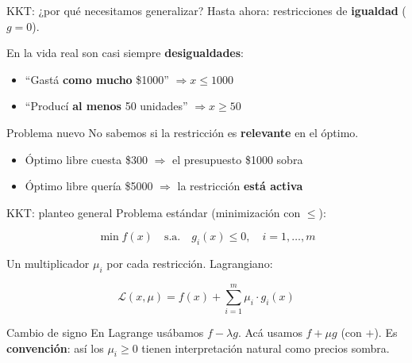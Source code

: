 \documentclass{beamer}
\begin{document}
\begin{frame}{KKT: ¿por qué necesitamos generalizar?}
    \small
    Hasta ahora: restricciones de \textbf{igualdad} ($g = 0$).

    \vspace{0.5em}

    En la vida real son casi siempre \textbf{desigualdades}:
    \begin{itemize}
        \item ``Gastá \textbf{como mucho} \$1000'' $\Rightarrow x \leq 1000$
        \item ``Producí \textbf{al menos} 50 unidades'' $\Rightarrow x \geq 50$
    \end{itemize}

    \vspace{0.8em}

    \begin{alertblock}{Problema nuevo}
        No sabemos si la restricción es \textbf{relevante} en el óptimo.
    \end{alertblock}

    \vspace{0.5em}

    \begin{itemize}
        \item Óptimo libre cuesta \$300 $\Rightarrow$ el presupuesto \$1000 sobra
        \item Óptimo libre quería \$5000 $\Rightarrow$ la restricción \textbf{está activa}
    \end{itemize}
\end{frame}

\begin{frame}{KKT: planteo general}
    \small
    Problema estándar (minimización con $\leq$):

    \[
    \min f(x) \quad \text{s.a.} \quad g_i(x) \leq 0, \quad i = 1, \ldots, m
    \]

    \vspace{0.5em}

    Un multiplicador $\mu_i$ por cada restricción. Lagrangiano:

    \[
    \mathcal{L}(x, \mu) = f(x) + \sum_{i=1}^{m} \mu_i \cdot g_i(x)
    \]

    \vspace{0.5em}

    \begin{alertblock}{Cambio de signo}
        En Lagrange usábamos $f - \lambda g$. Acá usamos $f + \mu g$ (con $+$). Es \textbf{convención}: así los $\mu_i \geq 0$ tienen interpretación natural como precios sombra.
    \end{alertblock}
\end{frame}
\end{document}
